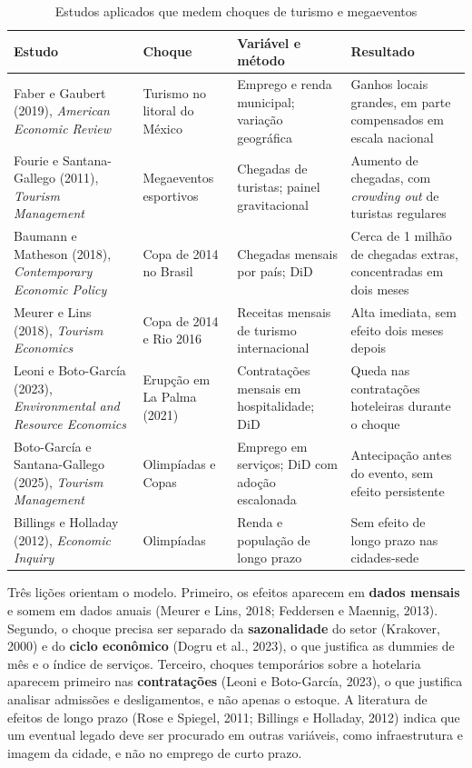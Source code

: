 \begin{table}[H]
\centering\footnotesize
\caption{Estudos aplicados que medem choques de turismo e megaeventos}\label{tab:literatura}
\begin{tabularx}{\linewidth}{>{\raggedright\arraybackslash}p{3.1cm}>{\raggedright\arraybackslash}p{2.4cm}>{\raggedright\arraybackslash}p{2.8cm}L}
\toprule
\textbf{Estudo} & \textbf{Choque} & \textbf{Variável e método} & \textbf{Resultado}\\
\midrule
Faber e Gaubert (2019), \textit{American Economic Review} & Turismo no litoral do México & Emprego e renda municipal; variação geográfica & Ganhos locais grandes, em parte compensados em escala nacional\\
Fourie e Santana-Gallego (2011), \textit{Tourism Management} & Megaeventos esportivos & Chegadas de turistas; painel gravitacional & Aumento de chegadas, com \textit{crowding out} de turistas regulares\\
Baumann e Matheson (2018), \textit{Contemporary Economic Policy} & Copa de 2014 no Brasil & Chegadas mensais por país; DiD & Cerca de 1 milhão de chegadas extras, concentradas em dois meses\\
Meurer e Lins (2018), \textit{Tourism Economics} & Copa de 2014 e Rio 2016 & Receitas mensais de turismo internacional & Alta imediata, sem efeito dois meses depois\\
Leoni e Boto-García (2023), \textit{Environmental and Resource Economics} & Erupção em La Palma (2021) & Contratações mensais em hospitalidade; DiD & Queda nas contratações hoteleiras durante o choque\\
Boto-García e Santana-Gallego (2025), \textit{Tourism Management} & Olimpíadas e Copas & Emprego em serviços; DiD com adoção escalonada & Antecipação antes do evento, sem efeito persistente\\
Billings e Holladay (2012), \textit{Economic Inquiry} & Olimpíadas & Renda e população de longo prazo & Sem efeito de longo prazo nas cidades-sede\\
\bottomrule
\end{tabularx}
\end{table}

Três lições orientam o modelo. Primeiro, os efeitos aparecem em \textbf{dados mensais} e somem em dados
anuais (Meurer e Lins, 2018; Feddersen e Maennig, 2013). Segundo, o choque precisa ser separado da
\textbf{sazonalidade} do setor (Krakover, 2000) e do \textbf{ciclo econômico} (Dogru et al., 2023), o que
justifica as dummies de mês e o índice de serviços. Terceiro, choques temporários sobre a hotelaria
aparecem primeiro nas \textbf{contratações} (Leoni e Boto-García, 2023), o que justifica analisar
admissões e desligamentos, e não apenas o estoque. A literatura de efeitos de longo prazo (Rose e
Spiegel, 2011; Billings e Holladay, 2012) indica que um eventual legado deve ser procurado em outras
variáveis, como infraestrutura e imagem da cidade, e não no emprego de curto prazo.

